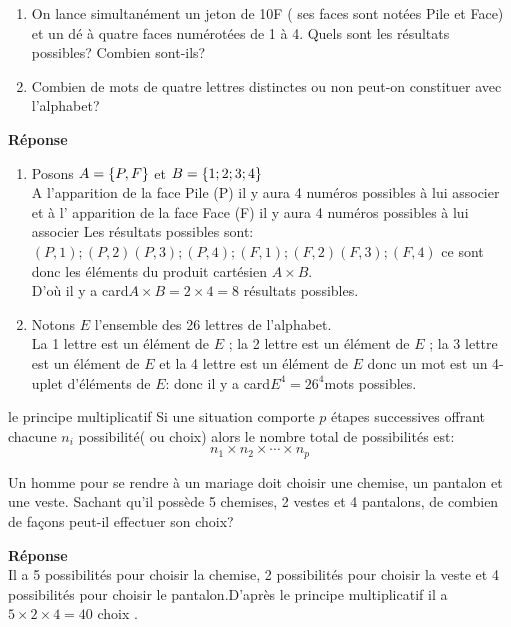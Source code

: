 \begin{exercice}
\begin{enumerate}
\item On lance  simultanément un jeton de 10F ( ses  faces sont notées Pile et  Face) et  un dé  à quatre faces numérotées de 1  à 4. Quels sont les résultats possibles? Combien sont-ils?
\item Combien de mots de quatre lettres distinctes ou non peut-on constituer avec l'alphabet?
\end{enumerate}
\end{exercice}
\textbf{Réponse}\\
\begin{enumerate}
\item Posons $ A=\left\{P, F\right\} $ et $ B= \left\{1; 2; 3; 4\right\} $\\
A l'apparition de la face Pile (P) il y aura 4 numéros possibles à lui associer et à l' apparition de la face Face (F) il y aura 4 numéros possibles à lui associer
Les résultats possibles sont: $ (P,1); (P,2)(P,3); (P,4);(F,1); (F,2)(F,3); (F,4) $ ce sont donc les éléments du produit cartésien $ A \times B $.\\
D'où il y a card$ A \times B=2 \times4=8 $ résultats possibles.

\item Notons $ E $ l'ensemble des 26 lettres de l'alphabet.\\
La  1 lettre est un élément de $ E$ ; la  2 lettre est un élément de $ E$ ; la  3 lettre est un élément de $ E$ et la  4 lettre est un élément de $ E$  donc un mot est un 4-uplet d'éléments de $ E $: donc il y a  card$ E^{4} =26^{4}$mots possibles.
\end{enumerate}
\begin{corollary}{ le principe multiplicatif}
Si une situation comporte $ p $  étapes successives offrant chacune $ n_{i} $ possibilité( ou choix) alors le nombre total de possibilités est:
\[n_{1}\times n_{2} \times \cdots \times n_{p} \]
\end{corollary}
\begin{example}
Un homme pour se rendre à un  mariage  doit choisir une chemise, un pantalon et une veste.  Sachant qu'il possède 5 chemises, 2 vestes et 4 pantalons, de combien de façons peut-il effectuer son choix?
\end{example}
\textbf{Réponse}\\
Il a 5 possibilités pour choisir la chemise, 2 possibilités pour choisir la veste et 4 possibilités pour choisir le pantalon.D'après le principe multiplicatif il a $ 5\times 2\times 4= 40 $ choix .

